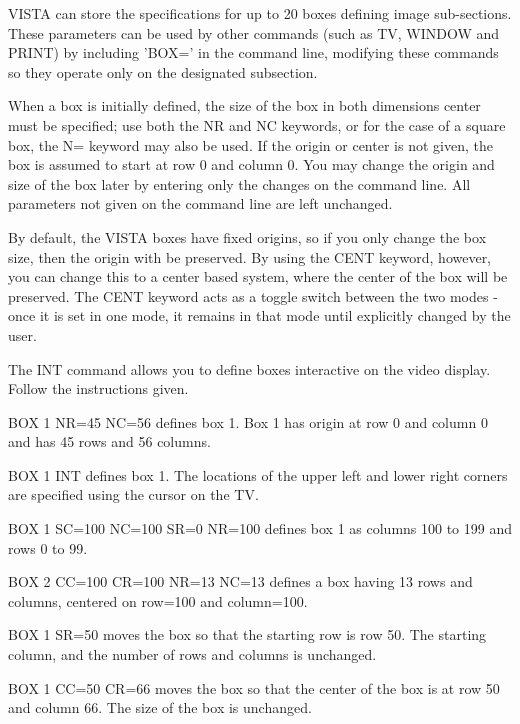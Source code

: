 VISTA can store the specifications for up to 20 boxes defining image
sub-sections.  These parameters can be used by other commands (such as TV,
WINDOW and PRINT) by including 'BOX=' in the command line, modifying these
commands so they operate only on the designated subsection.

When a box is initially defined, the size of the box in both dimensions
center must be specified; use both the NR and NC keywords, or for the case
of a square box, the N= keyword may also be used.  If the origin or center
is not given, the box is assumed to start at row 0 and column 0.  You may
change the origin and size of the box later by entering only the changes on
the command line.  All parameters not given on the command line are left
unchanged.

By default, the VISTA boxes have fixed origins, so if you only change the
box size, then the origin with be preserved. By using the CENT keyword,
however, you can change this to a center based system, where the center of
the box will be preserved. The CENT keyword acts as a toggle switch between
the two modes - once it is set in one mode, it remains in that mode until
explicitly changed by the user.

The INT command allows you to define boxes interactive on the video
display. Follow the instructions given.

\begin{example}
  \item[BOX 1 NR=45 NC=56\hfill]{defines box 1.  Box 1 has origin at row 0 and 
       column 0 and has 45 rows and 56 columns.}
  \item[BOX 1 INT\hfill]{defines box 1. The locations of the upper left and 
       lower right corners are specified using the cursor on the TV.}
  \item[BOX 1 SC=100 NC=100 SR=0 NR=100\hfill]{defines box 1 as columns
       100 to 199 and rows 0 to 99.}
  \item[BOX 2 CC=100 CR=100 NR=13 NC=13\hfill]{    defines a box having 13 rows
       and columns, centered on row=100 and column=100.}
\end{example}

\begin{example}
  \item[BOX 1 SR=50\hfill]{moves the box so that the starting row is row 50. 
       The starting column, and the number of rows and columns is unchanged.}
  \item[BOX 1 CC=50 CR=66\hfill]{moves the box so that the center of the box 
       is at row 50 and column 66.  The size of the box is unchanged.}
\end{example}

